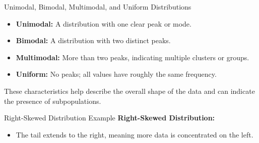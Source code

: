 \documentclass[handout]{beamer} %
\begin{document}
\begin{frame}{Unimodal, Bimodal, Multimodal, and Uniform Distributions}
    \begin{itemize}
        \item \textbf{Unimodal:} A distribution with one clear peak or mode.
        \item \textbf{Bimodal:} A distribution with two distinct peaks.
        \item \textbf{Multimodal:} More than two peaks, indicating multiple clusters or groups.
        \item \textbf{Uniform:} No peaks; all values have roughly the same frequency.
    \end{itemize}
    \vspace{0.5cm}
    These characteristics help describe the overall shape of the data and can indicate the presence of subpopulations.
\end{frame}

\begin{frame}{Right-Skewed Distribution Example}
    \textbf{Right-Skewed Distribution:}
    \begin{itemize}
        \item The tail extends to the right, meaning more data is concentrated on the left.
    \end{itemize}
    
    \begin{center}
    \end{center}
\end{frame}
\end{document}
